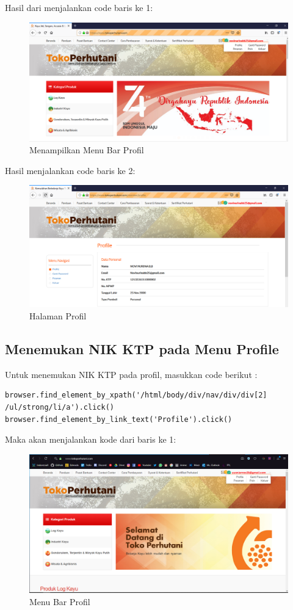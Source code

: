 Hasil dari menjalankan code baris ke 1:
\begin{figure}[h]
	\centering
	\includegraphics[scale=0.25]{figures/caripropil}
	\caption{Menampilkan Menu Bar Profil}
\end{figure}

Hasil menjalankan code baris ke 2:
\begin{figure}[h]
	\centering
	\includegraphics[scale=0.25]{figures/cari}
	\caption{Halaman Profil}
\end{figure}


\newpage
\subsection {Menemukan NIK KTP pada Menu Profile}
Untuk menemukan NIK KTP pada profil, masukkan code berikut :
\begin{verbatim}
browser.find_element_by_xpath('/html/body/div/nav/div/div[2]
/ul/strong/li/a').click()
browser.find_element_by_link_text('Profile').click()
\end{verbatim}

Maka akan menjalankan kode dari baris ke 1:
\begin{figure}[h]
	\centering
	\includegraphics[scale=0.25]{figures/735menuprofile}
	\caption{Menu Bar Profil}
\end{figure}

